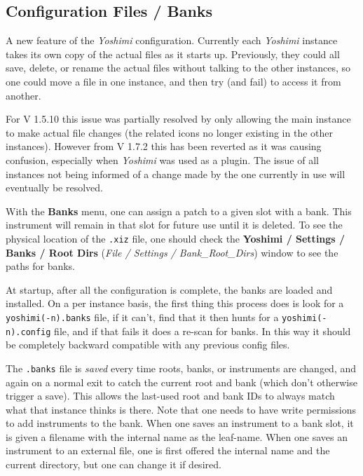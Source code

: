\subsection{Configuration Files / Banks}
\label{subsec:configuration_banks}

   A new feature of the \textsl{Yoshimi} configuration.  Currently each
   \textsl{Yoshimi} instance takes its own copy of the actual files as it starts
   up.  Previously, they could all save, delete, or rename the actual files without
   talking to the other instances, so one could move a file in one instance, and
   then try (and fail) to access it from another.

   For V 1.5.10 this issue was partially resolved by only allowing the main instance
   to make actual file changes (the related icons no longer existing in the
   other instances). However from V 1.7.2 this has been reverted as it was causing
   confusion, especially when \textsl{Yoshimi} was used as a plugin. The issue of
   all instances not being informed of a change made by the one currently in use
   will eventually be resolved.

   With the \textbf{Banks} menu, one can assign a patch to a given slot with
   a bank.  This instrument will remain in that slot for future use until it is
   deleted. To see the physical location of the \texttt{.xiz} file, one
   should check the
   \textbf{Yoshimi / Settings / Banks / Root Dirs}
   (\textsl{File / Settings / Bank\_Root\_Dirs}) window to see the paths for
   banks.

   At startup, after all the configuration is complete, the banks are loaded and
   installed.  On a per instance basis, the first thing this process does is
   look for a \texttt{yoshimi(-n).banks} file, if it can't, find that it then
   hunts for a \texttt{yoshimi(-n).config} file, and if that fails it does a
   re-scan for banks. In this way it should be completely backward compatible
   with any previous config files.

   The \texttt{.banks} file is \textsl{saved} every time roots, banks, or
   instruments are changed, and again on a normal exit to catch the current
   root and bank (which don't otherwise trigger a save).  This allows the
   last-used root and bank IDs to always match what that instance thinks is
   there.  Note that one needs to have write permissions to add instruments to
   the bank.  When one saves an instrument to a bank slot, it is given a
   filename with the internal name as the leaf-name.  When one saves an
   instrument to an external file, one is  first offered the internal name
   and the current directory, but one can change it if desired.

